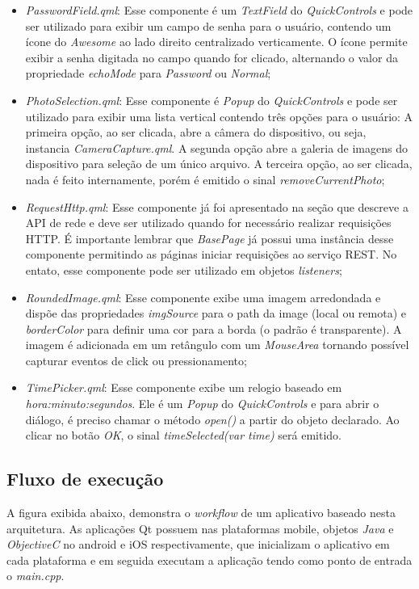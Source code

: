 \begin{itemize}
	\item \textit{PasswordField.qml}: Esse componente é um \textit{TextField} do \textit{QuickControls} e pode ser utilizado para exibir um campo de senha para o usuário, contendo um ícone do \textit{Awesome} ao lado direito centralizado verticamente. O ícone permite exibir a senha digitada no campo quando for clicado, alternando o valor da propriedade \textit{echoMode} para \textit{Password} ou \textit{Normal};

	\item \textit{PhotoSelection.qml}: Esse componente é \textit{Popup} do \textit{QuickControls} e pode ser utilizado para exibir uma lista vertical contendo três opções para o usuário: A primeira opção, ao ser clicada, abre a câmera do dispositivo, ou seja, instancia \textit{CameraCapture.qml}. A segunda opção abre a galeria de imagens do dispositivo para seleção de um único arquivo. A terceira opção, ao ser clicada, nada é feito internamente, porém é emitido o sinal \textit{removeCurrentPhoto};

	\item \textit{RequestHttp.qml}: Esse componente já foi apresentado na seção que descreve a API de rede e deve ser utilizado quando for necessário realizar requisições HTTP. É importante lembrar que \textit{BasePage} já possui uma instância desse componente permitindo as páginas iniciar requisições ao serviço REST. No entato, esse componente pode ser utilizado em objetos \textit{listeners};

	\item \textit{RoundedImage.qml}: Esse componente exibe uma imagem arredondada e dispõe das propriedades \textit{imgSource} para o path da image (local ou remota) e \textit{borderColor} para definir uma cor para a borda (o padrão é transparente). A imagem é adicionada em um retângulo com um \textit{MouseArea} tornando possível capturar eventos de click ou pressionamento;

	\item \textit{TimePicker.qml}: Esse componente exibe um relogio baseado em \textit{hora:minuto:segundos}. Ele é um \textit{Popup} do \textit{QuickControls} e para abrir o diálogo, é preciso chamar o método \textit{open()} a partir do objeto declarado. Ao clicar no botão \textit{OK}, o sinal \textit{timeSelected(var time)} será emitido.
\end{itemize}


\subsection{Fluxo de execução}\label{sec:solucao-desenvolvida}
A figura exibida abaixo, demonstra o \textit{workflow} de um aplicativo baseado nesta arquitetura. As aplicações Qt possuem nas plataformas mobile, objetos \textit{Java} e \textit{ObjectiveC} no android e iOS respectivamente, que inicializam o aplicativo em cada plataforma e em seguida executam a aplicação tendo como ponto de entrada o \textit{main.cpp}.\par

